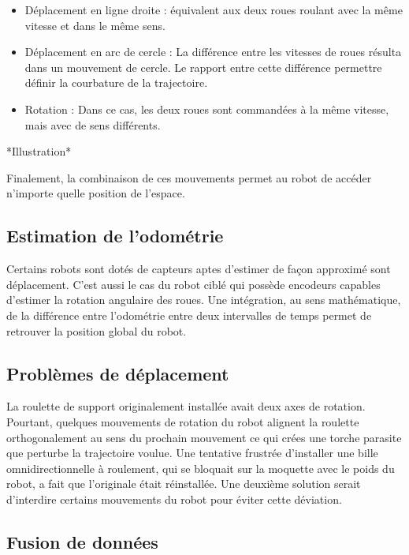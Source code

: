 \begin {itemize}
\item Déplacement en ligne droite : équivalent aux deux roues roulant
avec la même vitesse et dans le même sens.

\item Déplacement en arc de cercle : La différence entre les vitesses
de roues résulta dans un mouvement de cercle. Le rapport entre cette
différence permettre définir la courbature de la trajectoire.

\item Rotation : Dans ce cas, les deux roues sont commandées à la même
vitesse, mais avec de sens différents.
\end{itemize}

*Illustration*

Finalement, la combinaison de ces mouvements permet au robot de
accéder n'importe quelle position de l’espace.

\subsection{Estimation de l'odométrie}

Certains robots sont dotés de capteurs aptes d'estimer de façon
approximé sont déplacement. C'est aussi le cas du robot ciblé qui
possède encodeurs capables d'estimer la rotation angulaire des
roues. Une intégration, au sens mathématique, de la différence entre
l'odométrie entre deux intervalles de temps permet de retrouver la
position global du robot.

\subsection{Problèmes de déplacement}

La roulette de support originalement installée avait deux axes de
rotation. Pourtant, quelques mouvements de rotation du robot alignent
la roulette orthogonalement au sens du prochain mouvement ce qui crées
une torche parasite que perturbe la trajectoire voulue. Une tentative
frustrée d'installer une bille omnidirectionnelle à roulement, qui se
bloquait sur la moquette avec le poids du robot, a fait que
l'originale était réinstallée. Une deuxième solution serait d'interdire
certains mouvements du robot pour éviter cette déviation.

\subsection{Fusion de données}

